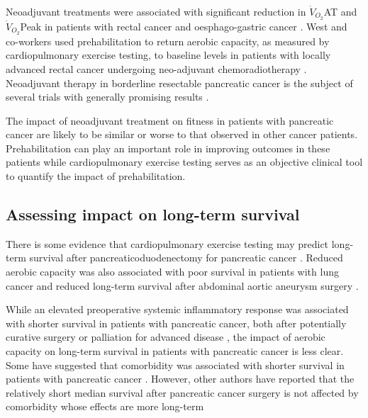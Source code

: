 Neoadjuvant treatments were associated with significant reduction in $\dot{V}_{O_2}$AT and $\dot{V}_{O_2}$Peak in patients with rectal cancer \parencite{west_effects_2014} and oesphago-gastric cancer \parencite{jack_effect_2014}.
West and co-workers used prehabilitation to return aerobic capacity, as measured by cardiopulmonary exercise testing, to baseline levels in patients with locally advanced rectal cancer undergoing neo-adjuvant chemoradiotherapy \parencite{west_effect_2015}.
Neoadjuvant therapy in borderline resectable pancreatic cancer is the subject of several trials with generally promising results \parencite{evans_preoperative_2008, gillen_preoperative/neoadjuvant_2010, golcher_neoadjuvant_2015, kim_multi-institutional_2013, sahora_phase_2014}.

The impact of neoadjuvant treatment on fitness in patients with pancreatic cancer are likely to be similar or worse to that observed in other cancer patients.
Prehabilitation can play an important role in improving outcomes in these patients while cardiopulmonary exercise testing serves as an objective clinical tool to quantify the impact of prehabilitation.

\subsection{Assessing impact on long-term survival}

There is some evidence that cardiopulmonary exercise testing may predict long-term survival after pancreaticoduodenectomy for pancreatic cancer \parencite{junejo_cardiopulmonary_2014}.
Reduced aerobic capacity was also associated with poor survival in patients with lung cancer \parencite{jones_peak_2010} and reduced long-term survival after abdominal aortic aneurysm surgery \parencite{tang_cardiopulmonary_2012, grant_cardiopulmonary_2015}.

While an elevated preoperative systemic inflammatory response was associated with shorter survival in patients with pancreatic cancer, both after potentially curative surgery \parencite{jamieson_systemic_2005, torre_glasgow_2012} or palliation for advanced disease \parencite{glen_evaluation_2006}, the impact of aerobic capacity on long-term survival in patients with pancreatic cancer is less clear.
Some have suggested that comorbidity was associated with shorter survival in patients with pancreatic cancer \parencite{dias-santos_charlson_2015}.
However, other authors have reported that the relatively short median survival after pancreatic cancer surgery is not affected by comorbidity whose effects are more long-term \parencite{kos_evaluation_2014}

